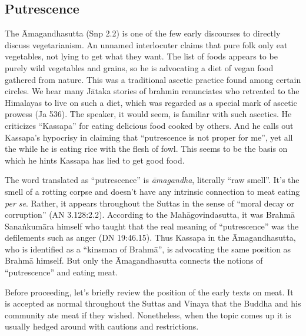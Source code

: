 \documentclass[12pt,openany]{book}%
\begin{document}
\subsection*{Putrescence}

The Āmagandhasutta (Snp 2.2) is one of the few early discourses to directly discuss vegetarianism. An unnamed interlocuter claims that pure folk only eat vegetables, not lying to get what they want. The list of foods appears to be purely wild vegetables and grains, so he is advocating a diet of vegan food gathered from nature. This was a traditional ascetic practice found among certain circles. We hear many \textsanskrit{Jātaka} stories of brahmin renunciates who retreated to the Himalayas to live on such a diet, which was regarded as a special mark of ascetic prowess (Ja 536). The speaker, it would seem, is familiar with such ascetics. He criticizes “Kassapa” for eating delicious food cooked by others. And he calls out Kassapa’s hypocrisy in claiming that “putrescence is not proper for me”, yet all the while he is eating rice with the flesh of fowl. This seems to be the basis on which he hints Kassapa has lied to get good food.

The word translated as “putrescence” is \textit{\textsanskrit{āmagandha}}, literally “raw smell”. It’s the smell of a rotting corpse and doesn’t have any intrinsic connection to meat eating \emph{per se}. Rather, it appears throughout the Suttas in the sense of “moral decay or corruption” (AN 3.128:2.2). According to the \textsanskrit{Mahāgovindasutta}, it was \textsanskrit{Brahmā} \textsanskrit{Sanaṅkumāra} himself who taught that the real meaning of “putrescence” was the defilements such as anger (DN 19:46.15). Thus Kassapa in the Āmagandhasutta, who is identified as a “kinsman of \textsanskrit{Brahmā}”, is advocating the same position as \textsanskrit{Brahmā} himself. But only the Āmagandhasutta connects the notions of “putrescence” and eating meat.

Before proceeding, let’s briefly review the position of the early texts on meat. It is accepted as normal throughout the Suttas and Vinaya that the Buddha and his community ate meat if they wished. Nonetheless, when the topic comes up it is usually hedged around with cautions and restrictions.
\end{document}
